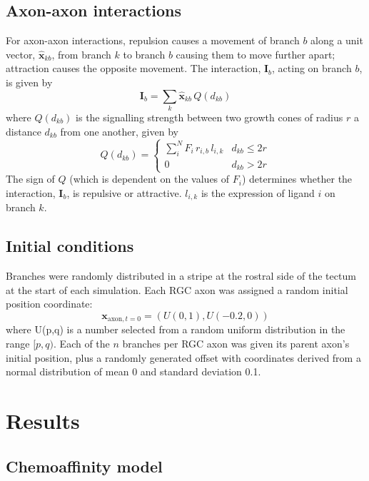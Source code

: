 \documentclass[11pt, a4paper]{article}
\begin{document}
\subsection*{Axon-axon interactions}

For axon-axon interactions, repulsion causes a movement of branch $b$ along a
unit vector, $\hat{\mathbf{x}}_{kb}$, from branch $k$ to branch $b$ causing
them to move further apart; attraction causes the opposite movement. The
interaction, $\mathbf{I}_b$, acting on branch $b$, is given by
%
\begin{equation}
\mathbf{I}_b = \sum_k \hat{\mathbf{x}}_{kb}\,Q(d_{kb})
\end{equation}
%
where $Q(d_{kb})$ is the signalling strength between two growth cones of
radius $r$ a distance $d_{kb}$ from one another, given by
%
\begin{equation}
Q(d_{kb}) = \begin{cases}
     \sum_i^N F_i\,r_{i,b}\,l_{i,k}    & d_{kb} \leq 2r \\
     0 & d_{kb} > 2r
     \end{cases}
\end{equation}
%
The sign of $Q$ (which is dependent on the values of $F_i$) determines whether
the interaction, $\mathbf{I}_b$, is repulsive or attractive. $l_{i,k}$ is the
expression of ligand $i$ on branch $k$.

\subsection*{Initial conditions}

Branches were randomly distributed in a stripe at the rostral side of the
tectum at the start of each simulation. Each RGC axon was assigned a random
initial position coordinate:
\begin{equation}
\mathbf{x}_{\text{axon},t=0} = (U(0,1), U(-0.2,0))
\end{equation}
where U(p,q) is a number selected from a random uniform distribution in the
range $[p,q)$. Each of the $n$ branches per RGC axon was given its parent
axon's initial position, plus a randomly generated offset with coordinates
derived from a normal distribution of mean 0 and standard deviation 0.1.

\section{Results}

\subsection*{Chemoaffinity model}
\end{document}
